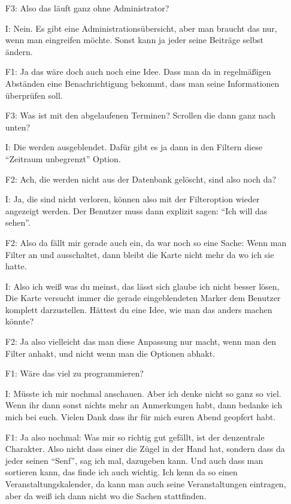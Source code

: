 \begin{itemize}
    \item[F3:] Also das l{\"a}uft ganz ohne Administrator?
    \item[I:] Nein. Es gibt eine Administrations{\"u}bersicht, aber man braucht das nur, wenn man eingreifen m{\"o}chte. Sonst kann ja jeder seine Beitr{\"a}ge selbst {\"a}ndern.
    \item[F1:] Ja das w{\"a}re doch auch noch eine Idee. Dass man da in regelm{\"a}{\ss}igen Abst{\"a}nden eine Benachrichtigung bekommt, dass man seine Informationen {\"u}berpr{\"u}fen soll.
    \item[F3:] Was ist mit den abgelaufenen Terminen? Scrollen die dann ganz nach unten?
    \item[I:] Die werden ausgeblendet. Daf{\"u}r gibt es ja dann in den Filtern diese "`Zeitraum unbegrenzt"' Option.
    \item[F2:] Ach, die werden nicht aus der Datenbank gel{\"o}scht, sind also noch da?
    \item[I:] Ja, die sind nicht verloren, k{\"o}nnen also mit der Filteroption wieder angezeigt werden. Der Benutzer muss dann explizit sagen: "`Ich will das sehen"'.
    \item[F2:] Also da f{\"a}llt mir gerade auch ein, da war noch so eine Sache: Wenn man Filter an und ausschaltet, dann bleibt die Karte nicht mehr da wo ich sie hatte.
    \item[I:] Also ich wei{\ss} was du meinst, das l{\"a}sst sich glaube ich nicht besser l{\"o}sen, Die Karte versucht immer die gerade eingeblendeten Marker dem Benutzer komplett darzustellen. H{\"a}ttest du eine Idee, wie man das anders machen k{\"o}nnte?
    \item[F2:] Ja also vielleicht das man diese Anpassung nur macht, wenn man den Filter anhakt, und nicht wenn man die Optionen abhakt.
    \item[F1:] W{\"a}re das viel zu programmieren?
    \item[I:] M{\"u}sste ich mir nochmal anschauen. Aber ich denke nicht so ganz so viel. Wenn ihr dann sonst nichts mehr an Anmerkungen habt, dann bedanke ich mich bei euch. Vielen Dank dass ihr f{\"u}r mich euren Abend geopfert habt.
    \item[F1:] Ja also nochmal: Was mir so richtig gut gef{\"a}llt, ist der denzentrale Charakter. Also nicht dass einer die Z{\"u}gel in der Hand hat, sondern dass da jeder seinen "`Senf"', sag ich mal, dazugeben kann. Und auch dass man sortieren kann, das finde ich auch wichtig. Ich kenn da so einen Veranstaltungskalender, da kann man auch seine Veranstaltungen eintragen, aber da wei{\ss} ich dann nicht wo die Sachen stattfinden.

\end{itemize}
